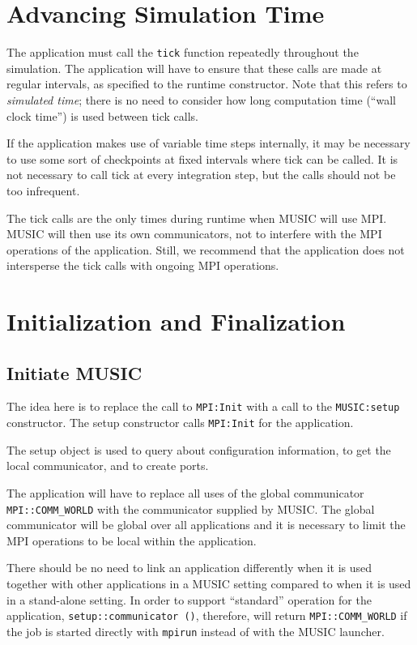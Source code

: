 \documentclass[a4paper]{report}
\begin{document}
\section{Advancing Simulation Time}

The application must call the \lstinline|tick| function repeatedly
throughout the simulation.  The application will have to ensure that
these calls are made at regular intervals, as specified to the runtime
constructor.  Note that this refers to \emph{simulated time}; there is
no need to consider how long computation time (``wall clock time'') is
used between tick calls.

If the application makes use of variable time steps internally, it may
be necessary to use some sort of checkpoints at fixed intervals where
tick can be called.  It is not necessary to call tick at every
integration step, but the calls should not be too infrequent.

The tick calls are the only times during runtime when MUSIC will use
MPI.  MUSIC will then use its own communicators, not to interfere with
the MPI operations of the application.  Still, we recommend that the
application does not intersperse the tick calls with ongoing MPI
operations.


\section{Initialization and Finalization}

\subsection{Initiate MUSIC}

The idea here is to replace the call to \lstinline|MPI:Init| with a
call to the \lstinline|MUSIC:setup| constructor.  The setup
constructor calls \lstinline|MPI:Init| for the application.

The setup object is used to query about configuration information, to
get the local communicator, and to create ports.

The application will have to replace all uses of the global
communicator \lstinline|MPI::COMM_WORLD| with the communicator
supplied by MUSIC.  The global communicator will be global over all
applications and it is necessary to limit the MPI operations to be
local within the application.

There should be no need to link an application differently when it is
used together with other applications in a MUSIC setting compared to
when it is used in a stand-alone setting.  In order to support
``standard'' operation for the application,
\lstinline|setup::communicator ()|, therefore, will return
\lstinline|MPI::COMM_WORLD| if the job is started directly with
\lstinline|mpirun| instead of with the MUSIC launcher.
\end{document}
